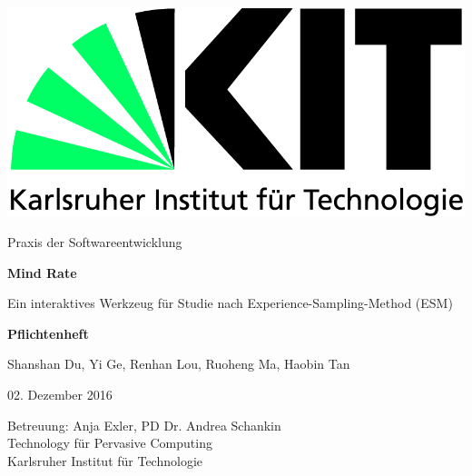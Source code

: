 \documentclass[a4paper]{scrreprt}
\begin{document}

    \begin{flushright}
        \includegraphics[scale = 0.7]{kit-logo.jpg}\\[0.5cm]
    \end{flushright}
    \vspace*{2cm}

    \begin{center} \large

        Praxis der Softwareentwicklung
        \vspace * {1.5cm}

        \textbf{\huge Mind Rate}
		
        \vspace*{1cm}
		
        {\Large Ein interaktives Werkzeug f\"ur Studie nach Experience-Sampling-Method (ESM)}

        \vspace*{1cm}

        \textbf{\Large Pflichtenheft}
        \vspace*{2cm}

        Shanshan Du, Yi Ge, Renhan Lou, Ruoheng Ma, Haobin Tan
        \vspace*{1cm}

        02. Dezember 2016
        \vspace*{2.5cm}


        Betreuung: Anja Exler, PD Dr. Andrea Schankin\\[1cm]
        Technology f\"ur Pervasive Computing\\[0.5cm]
        Karlsruher Institut für Technologie
    \end{center}
\end{document}
